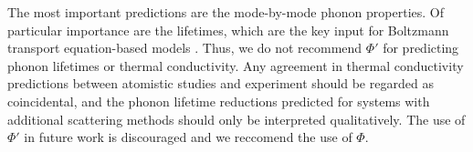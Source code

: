 The most important predictions are the mode-by-mode phonon properties. Of 
particular importance are 
the lifetimes, which are the key input for Boltzmann transport 
equation-based models 
\cite{mcgaughey_size-dependent_2011}. Thus, we do not recommend $\Phi'$ 
for predicting phonon lifetimes or 
thermal conductivity.  Any agreement in thermal conductivity predictions 
between atomistic 
studies\cite{thomas_predicting_2010} and experiment
\cite{koker_thermal_2009,qiu_molecular_2011} should 
be regarded as 
coincidental, and the phonon lifetime reductions predicted for systems 
with additional scattering 
methods \cite{thomas_predicting_2010,shiomi_thermal_2011} should only 
be interpreted qualitatively. The use of $\Phi'$ 
in future work is discouraged and we reccomend the use of $\Phi$.



